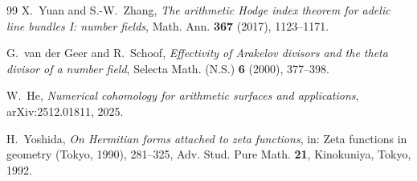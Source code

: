 \documentclass[11pt]{amsart}
\theoremstyle{definition}
\theoremstyle{remark}
\begin{document}
\begin{thebibliography}{99}
X.~Yuan and S.-W.~Zhang, \emph{The arithmetic Hodge index theorem for
adelic line bundles I: number fields}, Math. Ann. \textbf{367} (2017),
1123--1171.

G.~van der Geer and R.~Schoof, \emph{Effectivity of Arakelov divisors and the
theta divisor of a number field}, Selecta Math. (N.S.) \textbf{6} (2000),
377--398.

W.~He, \emph{Numerical cohomology for arithmetic surfaces and applications},
arXiv:2512.01811, 2025.

H.~Yoshida, \emph{On Hermitian forms attached to zeta functions}, in: Zeta
functions in geometry (Tokyo, 1990), 281--325, Adv. Stud. Pure Math.
\textbf{21}, Kinokuniya, Tokyo, 1992.

\end{thebibliography}
\end{document}
